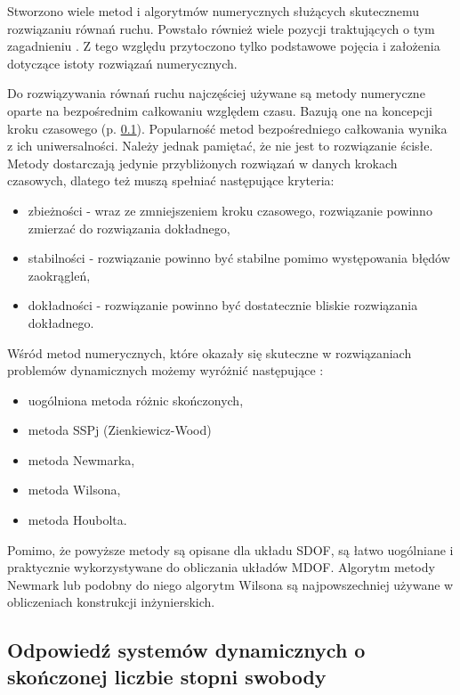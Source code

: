 Stworzono wiele metod i algorytmów numerycznych służących skutecznemu rozwiązaniu równań ruchu. Powstało również wiele pozycji traktujących o tym zagadnieniu \parencite{Humar1974,Hughes1987,Bathe2006,Bajer2012,Rakowski2016}. Z tego względu przytoczono tylko podstawowe pojęcia i założenia dotyczące istoty rozwiązań numerycznych.

Do rozwiązywania równań ruchu najczęściej używane są metody numeryczne oparte na bezpośrednim całkowaniu względem czasu. Bazują one na koncepcji kroku czasowego  (p. \ref{section: mdof_response}). Popularność metod bezpośredniego całkowania wynika z ich uniwersalności. Należy jednak pamiętać, że nie jest to rozwiązanie ścisłe. Metody dostarczają jedynie przybliżonych rozwiązań w danych krokach czasowych, dlatego też muszą spełniać następujące kryteria:
\begin{itemize}
	\item zbieżności  - wraz ze zmniejszeniem kroku czasowego, rozwiązanie powinno zmierzać do rozwiązania dokładnego,
	\item stabilności  - rozwiązanie powinno być stabilne pomimo występowania błędów zaokrągleń,
	\item dokładności  - rozwiązanie powinno być dostatecznie bliskie rozwiązania dokładnego.
\end{itemize}
Wśród metod numerycznych, które okazały się skuteczne w rozwiązaniach problemów dynamicznych możemy wyróżnić następujące \parencite{Rakowski2016}:
\begin{itemize}
\item uogólniona metoda różnic skończonych,
\item metoda SSPj (Zienkiewicz-Wood)
\item metoda Newmarka,
\item metoda Wilsona, 
\item metoda Houbolta.
\end{itemize}
Pomimo, że powyższe metody są opisane dla układu SDOF, są łatwo uogólniane i praktycznie wykorzystywane do obliczania układów MDOF. Algorytm metody Newmark lub podobny do niego algorytm Wilsona są najpowszechniej używane w obliczeniach konstrukcji inżynierskich.

\subsection{Odpowiedź systemów dynamicznych o skończonej liczbie stopni swobody} \label{section: mdof_response}

